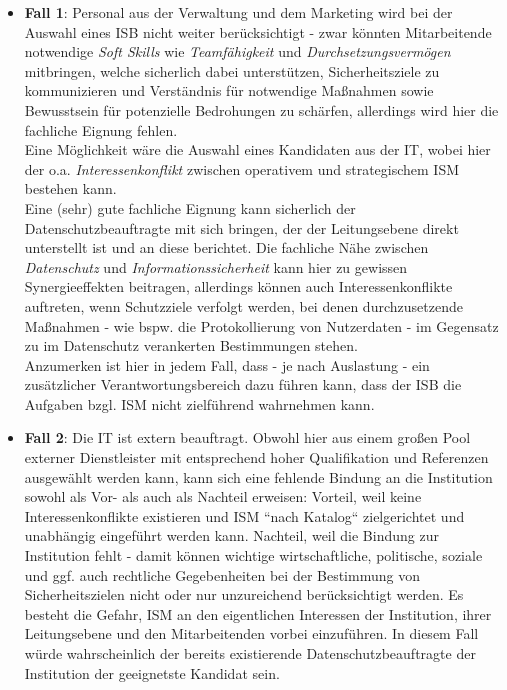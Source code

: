 \begin{itemize}
\itemsep0.5em
\item \textbf{Fall 1}: Personal aus der Verwaltung und dem Marketing wird bei der Auswahl eines ISB nicht weiter berücksichtigt - zwar könnten Mitarbeitende notwendige \textit{Soft Skills} wie \textit{Teamfähigkeit} und \textit{Durchsetzungsvermögen} mitbringen, welche sicherlich dabei unterstützen, Sicherheitsziele zu kommunizieren und Verständnis für notwendige Maßnahmen sowie Bewusstsein für potenzielle Bedrohungen zu schärfen, allerdings wird hier die fachliche Eignung fehlen.\\
Eine Möglichkeit wäre die Auswahl eines Kandidaten aus der IT, wobei hier der o.a. \textit{Interessenkonflikt} zwischen operativem und strategischem ISM bestehen kann.\\
Eine (sehr) gute fachliche Eignung kann sicherlich der Datenschutzbeauftragte mit sich bringen, der der Leitungsebene direkt unterstellt ist und an diese berichtet.
Die fachliche Nähe zwischen \textit{Datenschutz} und \textit{Informationssicherheit} kann hier zu gewissen Synergieeffekten beitragen, allerdings können auch Interessenkonflikte auftreten, wenn Schutzziele verfolgt werden, bei denen durchzusetzende Maßnahmen - wie bspw. die Protokollierung von Nutzerdaten - im Gegensatz zu im Datenschutz verankerten Bestimmungen stehen.\\
Anzumerken ist hier in jedem Fall, dass - je nach Auslastung - ein zusätzlicher Verantwortungsbereich dazu führen kann, dass der ISB die Aufgaben bzgl. ISM nicht zielführend wahrnehmen kann.

\item \textbf{Fall 2}: Die IT ist extern beauftragt.
Obwohl hier aus einem großen Pool externer Dienstleister mit entsprechend hoher Qualifikation und Referenzen ausgewählt werden kann, kann sich eine fehlende Bindung an die Institution sowohl als Vor- als auch als Nachteil erweisen:
Vorteil, weil keine Interessenkonflikte existieren und ISM ``nach Katalog`` zielgerichtet und unabhängig eingeführt werden kann.
Nachteil, weil die Bindung zur Institution fehlt - damit können wichtige wirtschaftliche, politische, soziale und ggf. auch rechtliche Gegebenheiten bei der Bestimmung von Sicherheitszielen nicht oder nur unzureichend berücksichtigt werden. Es besteht die Gefahr, ISM an den eigentlichen Interessen der Institution, ihrer Leitungsebene und den Mitarbeitenden vorbei einzuführen.
In diesem Fall würde wahrscheinlich der bereits existierende Datenschutzbeauftragte der Institution der geeignetste Kandidat sein.
\end{itemize}
